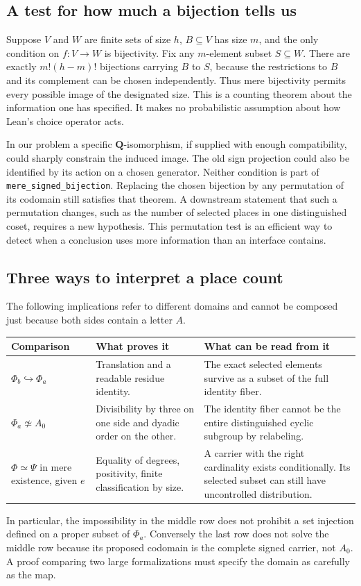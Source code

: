 \documentclass[12pt,letterpaper]{article}
\newcommand{\id}[1]{{\small\nolinkurl{#1}}}
\begin{document}
\subsection{A test for how much a bijection tells us}
Suppose $V$ and $W$ are finite sets of size $h$, $B\subseteq V$ has size $m$, and the only condition on $f:V\to W$ is bijectivity. Fix any $m$-element subset $S\subseteq W$. There are exactly $m!(h-m)!$ bijections carrying $B$ to $S$, because the restrictions to $B$ and its complement can be chosen independently. Thus mere bijectivity permits every possible image of the designated size. This is a counting theorem about the information one has specified. It makes no probabilistic assumption about how Lean's choice operator acts.

In our problem a specific $\mathbf Q$-isomorphism, if supplied with enough compatibility, could sharply constrain the induced image. The old sign projection could also be identified by its action on a chosen generator. Neither condition is part of \id{mere_signed_bijection}. Replacing the chosen bijection by any permutation of its codomain still satisfies that theorem. A downstream statement that such a permutation changes, such as the number of selected places in one distinguished coset, requires a new hypothesis. This permutation test is an efficient way to detect when a conclusion uses more information than an interface contains.

\subsection{Three ways to interpret a place count}
The following implications refer to different domains and cannot be composed just because both sides contain a letter $A$.
\begin{center}\small
\begin{tabularx}{\linewidth}{@{}p{.26\linewidth}YY@{}}\toprule
Comparison & What proves it & What can be read from it\\\midrule
$\Phi_b\hookrightarrow\Phi_a$ & Translation and a readable residue identity. & The exact selected elements survive as a subset of the full identity fiber.\\
$\Phi_a\not\simeq A_0$ & Divisibility by three on one side and dyadic order on the other. & The identity fiber cannot be the entire distinguished cyclic subgroup by relabeling.\\
$\Phi\simeq\Psi$ in mere existence, given $e$ & Equality of degrees, positivity, finite classification by size. & A carrier with the right cardinality exists conditionally. Its selected subset can still have uncontrolled distribution.\\\bottomrule
\end{tabularx}\end{center}
In particular, the impossibility in the middle row does not prohibit a set injection defined on a proper subset of $\Phi_a$. Conversely the last row does not solve the middle row because its proposed codomain is the complete signed carrier, not $A_0$. A proof comparing two large formalizations must specify the domain as carefully as the map.
\end{document}
